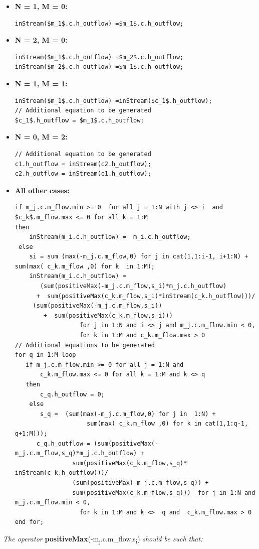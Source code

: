 \documentclass[10pt,a4paper]{report}
\begin{document}
\begin{itemize}
\item \textbf{N = 1, M = 0:}\newline
\begin{lstlisting}[language=modelica,mathescape=true]
inStream($m_1$.c.h_outflow) =$m_1$.c.h_outflow;
\end{lstlisting}
\item
\textbf{N = 2, M = 0:}\newline
\begin{lstlisting}[language=modelica,mathescape=true]
inStream($m_1$.c.h_outflow) =$m_2$.c.h_outflow;
inStream($m_2$.c.h_outflow) =$m_1$.c.h_outflow;
\end{lstlisting}
\item \textbf{N = 1, M = 1:}\newline
\begin{lstlisting}[language=modelica,mathescape=true]
inStream($m_1$.c.h_outflow) =inStream($c_1$.h_outflow);
// Additional equation to be generated
$c_1$.h_outflow = $m_1$.c.h_outflow;
\end{lstlisting}
\item \textbf{N = 0, M = 2:}\newline
\begin{lstlisting}[language=modelica,mathescape=true]
// Additional equation to be generated
c1.h_outflow = inStream(c2.h_outflow);
c2.h_outflow = inStream(c1.h_outflow);
\end{lstlisting}

\item\textbf{All other cases:}\newline
\begin{lstlisting}[language=modelica]
if m_j.c.m_flow.min >= 0  for all j = 1:N with j <> i  and  $c_k$.m_flow.max <= 0 for all k = 1:M
then 
    inStream(m_i.c.h_outflow) =  m_i.c.h_outflow;
 else 
    si = sum (max(-m_j.c.m_flow,0) for j in cat(1,1:i-1, i+1:N) + sum(max( c_k.m_flow ,0) for k  in 1:M);
    inStream(m_i.c.h_outflow) = 
       (sum(positiveMax(-m_j.c.m_flow,s_i)*m_j.c.h_outflow)
      +  sum(positiveMax(c_k.m_flow,s_i)*inStream(c_k.h_outflow)))/ 
     (sum(positiveMax(-m_j.c.m_flow,s_i))
        +  sum(positiveMax(c_k.m_flow,s_i)))  
                  for j in 1:N and i <> j and m_j.c.m_flow.min < 0, 
                  for k in 1:M and c_k.m_flow.max > 0
// Additional equations to be generated
for q in 1:M loop
   if m_j.c.m_flow.min >= 0 for all j = 1:N and 
       c_k.m_flow.max <= 0 for all k = 1:M and k <> q
   then
       c_q.h_outflow = 0;
    else
       s_q =  (sum(max(-m_j.c.m_flow,0) for j in  1:N) +
                    sum(max( c_k.m_flow ,0) for k in cat(1,1:q-1, q+1:M)));
      c_q.h_outflow = (sum(positiveMax(-m_j.c.m_flow,s_q)*m_j.c.h_outflow) +
                sum(positiveMax(c_k.m_flow,s_q)* inStream(c_k.h_outflow)))/
                (sum(positiveMax(-m_j.c.m_flow,s_q)) +
                sum(positiveMax(c_k.m_flow,s_q)))  for j in 1:N and m_j.c.m_flow.min < 0,
                  for k in 1:M and k <>  q and  c_k.m_flow.max > 0
end for;
\end{lstlisting}
\end{itemize}
\emph{The operator}
\textbf{positiveMax}(-m\textsubscript{j}.c.m\_flow,s\textsubscript{i})
\emph{should be such that:}
\end{document}
